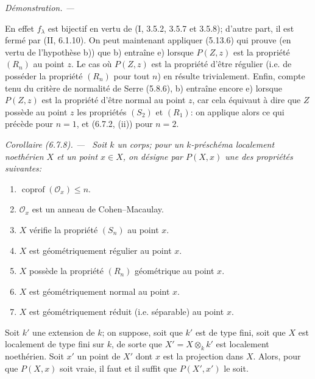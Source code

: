 \documentclass[10pt,oneside]{book}
\newcommand{\oldpage}[2][]{%
  \setcounter{footnote}{0}%
  \marginpar{\scriptsize\textbf{#1}~|~#2}\ignorespaces}
\newenvironment{corollary}[1][]{%
  \par\medskip\noindent\itshape Corollaire (#1). ---\ }{\par}
\newenvironment{proof}{%
  \par\medskip\noindent\textit{Démonstration. ---\ }}{\par}
\begin{document}
\begin{proof}
\oldpage[IV-2]{150}

En effet $f_\lambda$ est bijectif en vertu de (I, 3.5.2, 3.5.7 et 3.5.8);
d'autre part, il est fermé par (II, 6.1.10). On peut maintenant appliquer
(5.13.6) qui prouve (en vertu de l'hypothèse b)) que b) entraîne e) lorsque
$P(Z,z)$ est la propriété $(R_n)$ au point $z$. Le cas où $P(Z,z)$ est la
propriété d'être régulier (i.e. de posséder la propriété $(R_n)$ pour tout $n$)
en résulte trivialement. Enfin, compte tenu du critère de normalité de Serre
(5.8.6), b) entraîne encore e) lorsque $P(Z,z)$ est la propriété d'être normal
au point $z$, car cela équivaut à dire que $Z$ possède au point $z$ les
propriétés $(S_2)$ et $(R_1)$: on applique alors ce qui précède pour $n=1$,
et (6.7.2, (ii)) pour $n=2$.
\end{proof}

\begin{corollary}[6.7.8]
\label{IV.2.s6.7.8-fr}
Soit $k$ un corps; pour un $k$-préschéma localement noethérien $X$ et un
point $x\in X$, on désigne par $P(X,x)$ une des propriétés suivantes:
\begin{enumerate}
\item[(i)] $\operatorname{coprof}(\mathcal O_x)\leq n$.
\item[(ii)] $\mathcal O_x$ est un anneau de Cohen--Macaulay.
\item[(iii)] $X$ vérifie la propriété $(S_n)$ au point $x$.
\item[(iv)] $X$ est géométriquement régulier au point $x$.
\item[(v)] $X$ possède la propriété $(R_n)$ géométrique au point $x$.
\item[(vi)] $X$ est géométriquement normal au point $x$.
\item[(vii)] $X$ est géométriquement réduit (i.e. séparable) au point $x$.
\end{enumerate}
Soit $k'$ une extension de $k$; on suppose, soit que $k'$ est de type fini,
soit que $X$ est localement de type fini sur $k$, de sorte que
$X'=X\otimes_k k'$ est localement noethérien. Soit $x'$ un point de $X'$ dont
$x$ est la projection dans $X$. Alors, pour que $P(X,x)$ soit vraie, il faut
et il suffit que $P(X',x')$ le soit.
\end{corollary}
\end{document}
